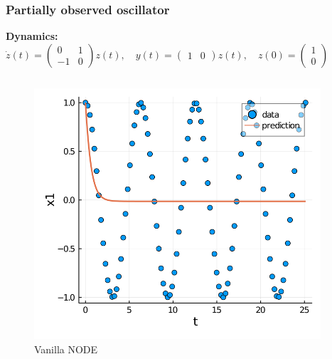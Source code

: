 \documentclass[11pt,aspectratio=169]{beamer}
\newcommand{\myvec}[1]{\ensuremath{\begin{pmatrix}#1\end{pmatrix}}}
\begin{document}
\begin{frame}[t]
    \frametitle{Partially observed oscillator}
    \textbf{Dynamics:} $\dot{z}(t) = \myvec{0 & 1\\-1 & 0}z(t),\quad y(t) = \myvec{1 & 0}z(t), \quad z(0) =\myvec{1\\0}$
    \begin{columns}[T]
        \begin{column}{0.25\textwidth}
        \pause
            \begin{figure}
                \centering
                \includegraphics[width=0.94\columnwidth]{figures/vanilla_node.png}
                            \vspace{-0.2cm}
                \caption{Vanilla NODE}
            \end{figure}
        \end{column}
        \begin{column}{0.5\textwidth}
\end{column}
\end{columns}
\end{frame}
\end{document}
